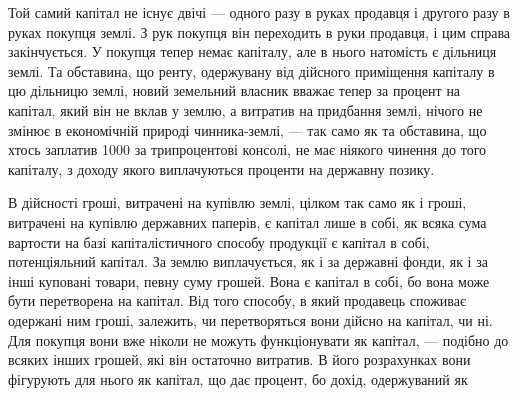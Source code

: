 Той самий капітал не існує двічі — одного разу в руках продавця і другого
разу в руках покупця землі. З рук покупця він переходить в руки продавця,
і цим справа закінчується. У покупця тепер немає капіталу, але в нього
натомість є дільниця землі. Та обставина, що ренту, одержувану від дійсного
приміщення капіталу в цю дільницю землі, новий земельний власник вважає
тепер за процент на капітал, який він не вклав у землю, а витратив на придбання
землі, нічого не змінює в економічній природі чинника-землі, — так само
як та обставина, що хтось заплатив 1000 за трипроцентові консолі,
не має ніякого чинення до того капіталу, з доходу якого виплачуються проценти
на державну позику.

В дійсності гроші, витрачені на купівлю землі, цілком так само як і
гроші, витрачені на купівлю державних паперів, є капітал лише в собі, як
всяка сума вартости на базі капіталістичного способу продукції є капітал в собі,
потенціяльний капітал. За землю виплачується, як і за державні фонди, як і
за інші куповані товари, певну суму грошей. Вона є капітал в собі, бо вона
може бути перетворена на капітал. Від того способу, в який продавець споживає
одержані ним гроші, залежить, чи перетворяться вони дійсно на капітал, чи ні.
Для покупця вони вже ніколи не можуть функціонувати як капітал, — подібно
до всяких інших грошей, які він остаточно витратив. В його розрахунках вони
фігурують для нього як капітал, що дає процент, бо дохід, одержуваний як
\parbreak{}  %
